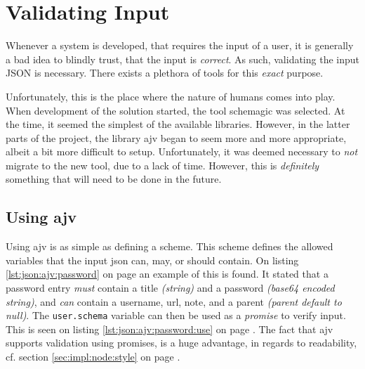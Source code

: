 	\section{Validating Input}
		Whenever a system is developed, that requires the input of a user, it is generally a bad idea to blindly trust, that the input is \emph{correct}. As such, validating the input JSON is necessary. There exists a plethora of tools for this \emph{exact} purpose. 

		Unfortunately, this is the place where the nature of humans comes into play. When development of the solution started, the tool schemagic was selected. At the time, it seemed the simplest of the available libraries. However, in the latter parts of the project, the library ajv began to seem more and more appropriate, albeit a bit more difficult to setup. Unfortunately, it was deemed necessary to \emph{not} migrate to the new tool, due to a lack of time. However, this is \emph{definitely} something that will need to be done in the future.

		\subsection{Using ajv}
			Using ajv is as simple as defining a scheme. This scheme defines the allowed variables that the input json can, may, or should contain. On listing \ref{lst:json:ajv:password} on page \pageref{lst:json:ajv:password} an example of this is found. It stated that a password entry \emph{must} contain a title \emph{(string)} and a password \emph{(base64 encoded string)}, and \emph{can} contain a username, url, note, and a parent \emph{(parent default to null)}. The \verb=user.schema= variable can then be used as a \emph{promise} to verify input. This is seen on listing \ref{lst:json:ajv:password:use} on page \pageref{lst:json:ajv:password}. The fact that ajv supports validation using promises, is a huge advantage, in regards to readability, cf. section \ref{sec:impl:node:style} on page \pageref{sec:impl:node:style}.

